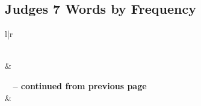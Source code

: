 




\subsection{Judges 7 Words by Frequency}


\normalsize
 
\begin{center}
\begin{longtable}{l|r}
\caption[Judges 7 Words by Frequency]{Judges 7 Words by Frequency}\label{table:WordsbyFrequency for Judges 7} \\
\hline {} &  \\ \hline 
\endfirsthead
 
{{\bfseries \tablename\ \thetable{} -- continued from previous page}} \\  
\hline {} &  \\ \hline 
\endhead
 

\end{longtable}
\end{center}
